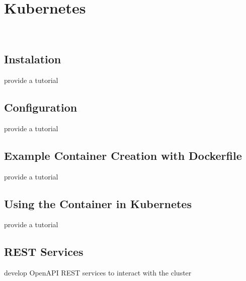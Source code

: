 \chapter{Kubernetes}

\FILENAME\


\section{Instalation}

\begin{exercise}
provide a tutorial 
\end{exercise}

\section{Configuration}

\begin{exercise}
provide a tutorial 
\end{exercise}

\section{Example Container Creation with Dockerfile}

\begin{exercise}
provide a tutorial 
\end{exercise}

\section{Using the Container in Kubernetes}

\begin{exercise}
provide a tutorial 
\end{exercise}

\section{REST Services}

\begin{exercise}
develop OpenAPI REST services to interact with the cluster
\end{exercise}

